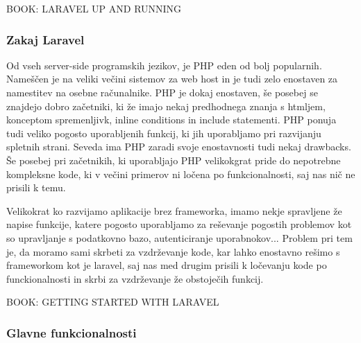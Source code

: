 \documentclass[12pt,a4paper,titlepage,openany]{report}
\begin{document}
BOOK: LARAVEL UP AND RUNNING

\subsubsection{Zakaj Laravel}

Od vseh server-side programskih jezikov, je PHP eden od bolj popularnih. Nameščen je na veliki večini sistemov za web host in je tudi zelo enostaven za namestitev na osebne računalnike. PHP je dokaj enostaven, še posebej se znajdejo dobro začetniki, ki že imajo nekaj predhodnega znanja s htmljem, konceptom spremenljivk, inline conditions in include statementi. PHP ponuja tudi veliko pogosto uporabljenih funkcij, ki jih uporabljamo pri razvijanju spletnih strani. Seveda ima PHP zaradi svoje enostavnosti tudi nekaj drawbacks. Še posebej pri začetnikih, ki uporabljajo PHP velikokgrat pride do nepotrebne kompleksne kode, ki v večini primerov ni ločena po funkcionalnosti, saj nas nič ne prisili k temu. 

Velikokrat ko razvijamo aplikacije brez frameworka, imamo nekje spravljene že napise funkcije, katere pogosto uporabljamo za reševanje pogostih problemov kot so upravljanje s podatkovno bazo, autenticiranje uporabnokov... Problem pri tem je, da moramo sami skrbeti za vzdrževanje kode, kar lahko enostavno rešimo s frameworkom kot je laravel, saj nas med drugim prisili k ločevanju kode po funckionalnosti in skrbi za vzdrževanje že obstoječih funkcij.

BOOK: GETTING STARTED WITH LARAVEL

\subsubsection{Glavne funkcionalnosti}
\end{document}
